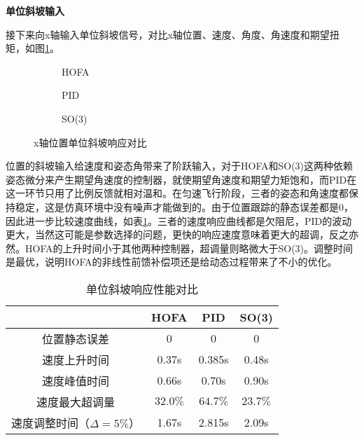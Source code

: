 \textbf{单位斜坡输入}

接下来向x轴输入单位斜坡信号，对比x轴位置、速度、角度、角速度和期望扭矩，如图\ref{matlab_t}。

\begin{figure}[h]
  \centering
  \begin{subfigure}[t]{0.33\textwidth}
    \centering
    \caption{HOFA}
  \end{subfigure}\hfill
  \begin{subfigure}[t]{0.33\textwidth}
    \centering
    \caption{PID}
  \end{subfigure}\hfill
  \begin{subfigure}[t]{0.33\textwidth}
    \centering
    \caption{SO(3)}
  \end{subfigure}
  \caption{x轴位置单位斜坡响应对比}
  \label{matlab_t}
\end{figure}

位置的斜坡输入给速度和姿态角带来了阶跃输入，对于HOFA和SO(3)这两种依赖姿态微分来产生期望角速度的控制器，就使期望角速度和期望力矩饱和，而PID在这一环节只用了比例反馈就相对温和。在匀速飞行阶段，三者的姿态和角速度都保持稳定，这是仿真环境中没有噪声才能做到的。由于位置跟踪的静态误差都是0，因此进一步比较速度曲线，如表\ref{matlab斜坡对比}。三者的速度响应曲线都是欠阻尼，PID的波动更大，当然这可能是参数选择的问题，更快的响应速度意味着更大的超调，反之亦然。HOFA的上升时间小于其他两种控制器，超调量则略微大于SO(3)。调整时间是最优，说明HOFA的非线性前馈补偿项还是给动态过程带来了不小的优化。

\begin{table}[h]
  \centering
  \caption{单位斜坡响应性能对比}
  \begin{tabular}{cccc}
      \toprule
      & HOFA & PID & SO(3) \\
      \midrule
    位置静态误差                  & 0    & 0 & 0 \\
    速度上升时间                   & 0.37s & 0.385s &0.48s \\
    速度峰值时间                  & 0.66s &0.70s  & 0.90s\\
    速度最大超调量                & $32.0\%$ & $64.7\%$  & $23.7\%$\\
    速度调整时间（$\Delta = 5\%$） & 1.67s &2.815s  & 2.09s\\
      \bottomrule
  \end{tabular}

  \label{matlab斜坡对比}
\end{table}

